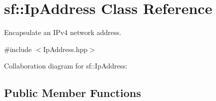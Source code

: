 \hypertarget{classsf_1_1_ip_address}{}\section{sf\+:\+:Ip\+Address Class Reference}
\label{classsf_1_1_ip_address}


Encapsulate an I\+Pv4 network address.  




{\ttfamily \#include $<$Ip\+Address.\+hpp$>$}



Collaboration diagram for sf\+:\+:Ip\+Address\+:
\subsection*{Public Member Functions}
